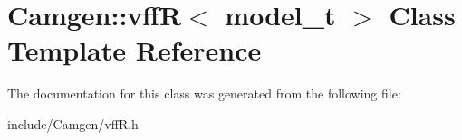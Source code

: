 \hypertarget{a00591}{}\section{Camgen\+:\+:vff\+R$<$ model\+\_\+t $>$ Class Template Reference}
\label{a00591}


The documentation for this class was generated from the following file\+:\begin{DoxyCompactItemize}
\item 
include/\+Camgen/vff\+R.\+h\end{DoxyCompactItemize}
